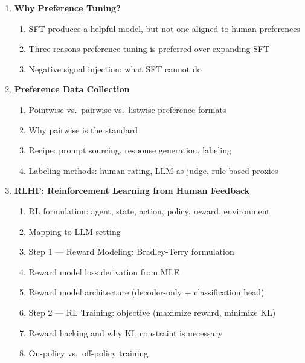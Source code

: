 \documentclass[11pt, a4paper]{article}
\begin{document}
\begin{enumerate}[label=\textbf{\arabic*.}, leftmargin=2em]
  \item \textbf{Why Preference Tuning?}
    \begin{enumerate}[label=\arabic{enumi}.\arabic*]
      \item SFT produces a helpful model, but not one aligned to human preferences
      \item Three reasons preference tuning is preferred over expanding SFT
      \item Negative signal injection: what SFT cannot do
    \end{enumerate}

  \item \textbf{Preference Data Collection}
    \begin{enumerate}[label=\arabic{enumi}.\arabic*]
      \item Pointwise vs.\ pairwise vs.\ listwise preference formats
      \item Why pairwise is the standard
      \item Recipe: prompt sourcing, response generation, labeling
      \item Labeling methods: human rating, LLM-as-judge, rule-based proxies
    \end{enumerate}

  \item \textbf{RLHF: Reinforcement Learning from Human Feedback}
    \begin{enumerate}[label=\arabic{enumi}.\arabic*]
      \item RL formulation: agent, state, action, policy, reward, environment
      \item Mapping to LLM setting
      \item Step 1 --- Reward Modeling: Bradley-Terry formulation
      \item Reward model loss derivation from MLE
      \item Reward model architecture (decoder-only + classification head)
      \item Step 2 --- RL Training: objective (maximize reward, minimize KL)
      \item Reward hacking and why KL constraint is necessary
      \item On-policy vs.\ off-policy training
    \end{enumerate}


\end{enumerate}
\end{document}
